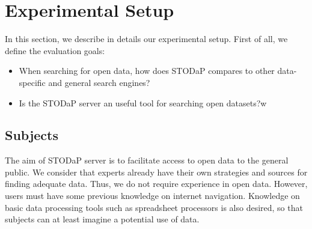 \section{Experimental Setup}
\label{sec:setup}


In this section, we describe in details our experimental setup.
First of all, we define the evaluation goals:
\begin{itemize}
	\item When searching for open data, how does STODaP compares to other data-specific and general search engines?
	\item Is the STODaP server an useful tool for searching open datasets?w
\end{itemize}

\subsection{Subjects}

The aim of STODaP server is to facilitate access to open data to the general public.
We consider that experts already have their own strategies and sources for finding adequate data.
Thus, we do not require experience in open data.
However, users must have some previous knowledge on internet navigation. 
Knowledge on basic data processing tools such as spreadsheet processors is also desired, so that subjects can at least imagine a potential use of data.

